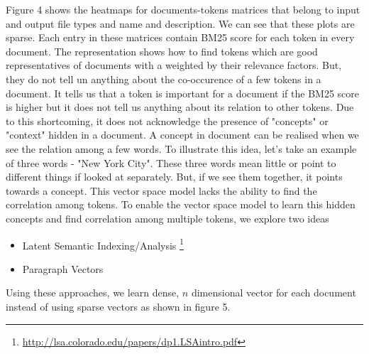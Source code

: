Figure 4 shows the heatmaps for documents-tokens matrices that belong to input and output file types and name and description. We can see that these plots are sparse. Each entry in these matrices contain BM25 score for each token in every document. The representation shows how to find tokens which are good representatives of documents with a weighted by their relevance factors. But, they do not tell un anything about the co-occurence of a few tokens in a document. It tells us that a token is important for a document if the BM25 score is higher but it does not tell us anything about its relation to other tokens. Due to this shortcoming, it does not acknowledge the presence of "concepts" or "context" hidden in a document. A concept in document can be realised when we see the relation among a few words. To illustrate this idea, let's take an example of three words - "New York City". These three words mean little or point to different things if looked at separately. But, if we see them together, it points towards a concept. This vector space model lacks the ability to find the correlation among tokens. To enable the vector space model to learn this hidden concepts and find correlation among multiple tokens, we explore two ideas
\begin{itemize}
\item Latent Semantic Indexing/Analysis \footnote{\url{http://lsa.colorado.edu/papers/dp1.LSAintro.pdf}}
\item Paragraph Vectors
\end{itemize}

Using these approaches, we learn dense, $n$ dimensional vector for each document instead of using sparse vectors as shown in figure 5. 


